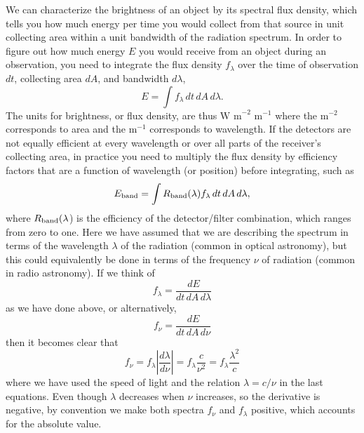 We can characterize the brightness of an object by its spectral flux density, which tells you how much energy per time you would collect from that source in unit collecting area within a unit bandwidth of the radiation spectrum.  
In order to figure out how much energy $E$ you would receive from an object during an observation, you need to integrate the flux density $f_\lambda$ over the time of observation $dt$, collecting area $dA$, and bandwidth $d\lambda$,
\begin{equation}
  E = \int f_\lambda \, dt\, dA\, d\lambda.
\end{equation}
The units for brightness, or flux density, are thus $\mbox{W m}^{-2}\mbox{ m}^{-1}$ where the  m$^{-2}$ corresponds to area and the m$^{-1}$ corresponds to wavelength.
If the detectors are not equally efficient at every wavelength or over all parts of the receiver's collecting area, in practice you need to multiply the flux density by efficiency factors that are a function of wavelength (or position) before integrating, such as
\begin{equation}
  E_{\rm band} = \int R_{\rm band}(\lambda) f_\lambda \, dt\, dA\, d\lambda,
\end{equation}
where $R_{\rm band}(\lambda$) is the efficiency of the detector/filter combination, which ranges from zero to one.
Here we have assumed that we are describing the spectrum in terms of the wavelength  $\lambda$ of the radiation (common in optical astronomy), but this could equivalently be done in terms of the frequency $\nu$ of radiation (common in radio astronomy).  If we think of
\begin{equation}
   f_\lambda = \frac{dE}{dt \, dA \, d\lambda}
\end{equation}
as we have done above, or alternatively,
\begin{equation}
  f_\nu = \frac{dE}{dt \, dA \, d\nu}
\end{equation}
then it becomes clear that
\begin{equation}
  f_\nu = f_\lambda \left| \frac{d\lambda}{d\nu} \right| = f_\lambda \frac{c}{\nu^2} = f_\lambda \frac{\lambda^2}{c}
\end{equation}
where we have used the speed of light and the relation $\lambda = c/\nu$ in the last equations.  Even though $\lambda$ decreases when $\nu$ increases, so the derivative is negative, by convention we make both spectra $f_\nu$ and  $f_\lambda$ positive, which accounts for the absolute value.

